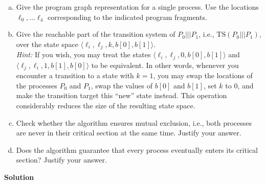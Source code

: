 \documentclass[a4paper,12pt]{article}
\begin{document}
\begin{enumerate}[(a)]
    \item Give the program graph representation for a single process. Use the locations $\ell_0, \dots \ell_4$ corresponding to the indicated program fragments.

    \item Give the reachable part of the transition system of $P_0 ||| P_1$, i.e., $\text{TS}(P_0 ||| P_1)$, over the state space $\langle \ell_i, \ell_j, k, b[0], b[1] \rangle$.\\
    \textit{Hint:} If you wish, you may treat the states $\langle \ell_i, \ell_j, 0, b[0], b[1] \rangle$ and \\$\langle \ell_j, \ell_i, 1, b[1], b[0] \rangle$ to be equivalent. 
    In other words, whenever you encounter a transition to a state with $k = 1$, you may swap the locations of the processes $P_0$ and $P_1$, 
    swap the values of $b[0]$ and $b[1]$, set $k$ to 0, and make the transition target this ``new'' state instead. This operation considerably reduces the size of the resulting state space.

    \item Check whether the algorithm ensures mutual exclusion, i.e., both processes are never in their critical section at the same time. Justify your answer.

    \item Does the algorithm guarantee that every process eventually enters its critical section? Justify your answer.
\end{enumerate}

\begin{center}
    \bfseries Solution
\end{center}
\end{document}
